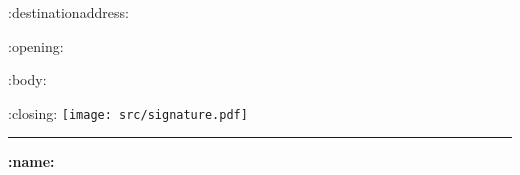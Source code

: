 \documentclass[ fontsize=12pt, parskip=full, paper=A4, fromalign=right, fromphone=false, fromemail=false, version=last,]{scrlttr2}
\begin{document}

\begin{letter}{:destinationaddress:}
\opening{:opening:}
:body:
\par
:closing:
\vspace*{0.4cm} \newline
\texttt{[image: src/signature.pdf]}
\newline
\rule{29mm}{0.2mm} \newline
\textbf{:name:}
\end{letter}
\end{document}
